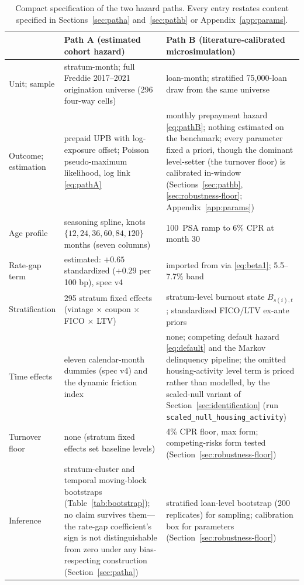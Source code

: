 \documentclass[12pt]{article}
\begin{document}
\begin{table}[H]
\centering
\caption{Compact specification of the two hazard paths. Every entry restates
content specified in Sections~\ref{sec:patha} and~\ref{sec:pathb} or
Appendix~\ref{app:params}.}
\label{tab:specbox}
\footnotesize
\begin{threeparttable}
\begin{tabular}{@{}p{2.2cm}p{5.9cm}p{5.9cm}@{}}
\toprule
 & Path A (estimated cohort hazard) & Path B (literature-calibrated microsimulation) \\
\midrule
Unit; sample & stratum-month; full Freddie 2017--2021 origination universe (296 four-way cells) & loan-month; stratified 75{,}000-loan draw from the same universe \\
Outcome; estimation & prepaid UPB with log-exposure offset; Poisson pseudo-maximum likelihood, log link \eqref{eq:pathA} & monthly prepayment hazard \eqref{eq:pathB}; nothing estimated on the benchmark; every parameter fixed a priori, though the dominant level-setter (the turnover floor) is calibrated in-window (Sections~\ref{sec:pathb}, \ref{sec:robustness-floor}; Appendix~\ref{app:params}) \\
Age profile & seasoning spline, knots $\{12,24,36,60,84,120\}$ months (seven columns) & 100~PSA ramp to 6\% CPR at month 30 \\
Rate-gap term & estimated: $+0.65$ standardized ($+0.29$ per 100 bp), spec v4 & imported from \citet{liebersohn2024} via \eqref{eq:beta1}; 5.5--7.7\% band \\
Stratification & 295 stratum fixed effects (vintage $\times$ coupon $\times$ FICO $\times$ LTV) & stratum-level burnout state $B_{s(i),t}$; standardized FICO/LTV ex-ante priors \\
Time effects & eleven calendar-month dummies (spec v4) and the dynamic friction index & none; competing default hazard \eqref{eq:default} and the Markov delinquency pipeline; the omitted housing-activity level term is priced rather than modelled, by the scaled-null variant of Section~\ref{sec:identification} (run \texttt{scaled\_null\_housing\_activity}) \\
Turnover floor & none (stratum fixed effects set baseline levels) & 4\% CPR floor, max form; competing-risks form tested (Section~\ref{sec:robustness-floor}) \\
Inference & stratum-cluster and temporal moving-block bootstraps (Table~\ref{tab:bootstrap}); no claim survives them---the rate-gap coefficient's sign is not distinguishable from zero under any bias-respecting construction (Section~\ref{sec:patha}) & stratified loan-level bootstrap (200 replicates) for sampling; calibration box for parameters (Section~\ref{sec:robustness-floor}) \\

\end{tabular}
\end{threeparttable}
\end{table}
\end{document}
